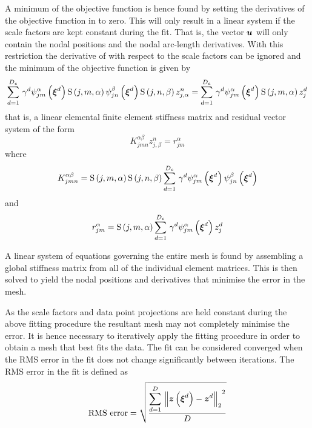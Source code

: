 A minimum of the objective function is hence found by setting the derivatives
of the objective function in  to zero.  This
will only result in a linear system if the scale factors are kept constant
during the fit. That is, the vector $\boldsymbol{u}$ will only contain the nodal
positions and the nodal arc-length derivatives.  With this restriction the
derivative of  with respect to the scale factors
can be ignored and the minimum of the objective function is given by
\begin{equation}
    \displaystyle\sum_{d=1}^{D_{e}} \,\gamma^{d}   \psi_{jm}^{\alpha} \left( \boldsymbol{\xi}^{d} \right)  
       \mathrm{S} \left( j,m,\alpha \right)     \psi_{jn}^{\beta} \left( \boldsymbol{\xi}^{d} \right)     \mathrm{S} \left( j,n,\beta \right)   
  z^{n}_{j,\alpha}=  \displaystyle\sum_{d=1}^{D_{e}} \,\gamma^{d}   \psi_{jm}^{\alpha} \left( \boldsymbol{\xi}^{d} \right)     \mathrm{S} \left( j,m,\alpha \right)  z^{d}_{j} 
\end{equation}
that is, a linear elemental finite element stiffness matrix and residual
vector system of the form
\begin{equation}
  K^{\alpha\beta}_{jmn}z^{n}_{j,\beta}=r^{\alpha}_{jm}
  \label{eqn:fittingelemstiffnessystem}
\end{equation}
where
\begin{equation}
  K^{\alpha\beta}_{jmn}=   \mathrm{S} \left( j,m,\alpha \right)     \mathrm{S} \left( j,n,\beta \right)    \displaystyle\sum_{d=1}^{D_{e}} \,
      \gamma^{d}   \psi_{jm}^{\alpha} \left( \boldsymbol{\xi}^{d} \right)     \psi_{jn}^{\beta} \left( \boldsymbol{\xi}^{d} \right)   
\end{equation}
and
\begin{equation}
  r^{\alpha}_{jm}=   \mathrm{S} \left( j,m,\alpha \right)    \displaystyle\sum_{d=1}^{D_{e}} \,\gamma^{d}   \psi_{jm}^{\alpha} \left( \boldsymbol{\xi}^{d} \right)  z^{d}_{j} 
\end{equation}

A linear system of equations governing the entire mesh is found by assembling
a global stiffness matrix from all of the individual element matrices. This is
then solved to yield the nodal positions and derivatives that minimise the
error in the mesh.

As the scale factors and data point projections are held constant during the
above fitting procedure the resultant mesh may not completely minimise the
error. It is hence necessary to iteratively apply the fitting procedure in
order to obtain a mesh that best fits the data. The fit can be considered
converged when the RMS error in the fit does not change significantly
between iterations. The RMS error in the fit is defined as
\begin{equation}
  \text{RMS error}=\sqrt{\dfrac{\gsum{d=1}{D}{\norm{\fnof{\vectr{z}}{
            \vectr{\xi}^{d}}-\vect{z}^{d}}^{2}}}{D}}
\end{equation}

